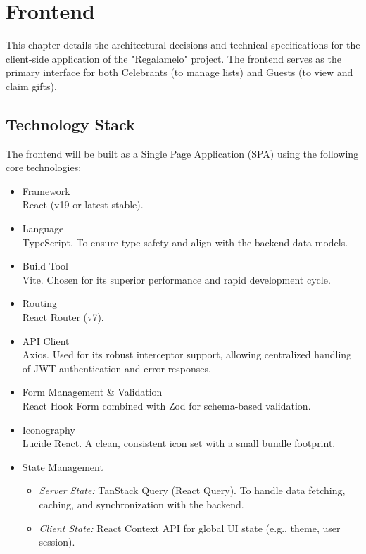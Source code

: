 \chapter{Frontend}
This chapter details the architectural decisions and technical specifications for the client-side application of the "Regalamelo" project. The frontend serves as the primary interface for both Celebrants (to manage lists) and Guests (to view and claim gifts).

\section{Technology Stack}
The frontend will be built as a Single Page Application (SPA) using the following core technologies:
\begin{itemize}
    \item Framework \\
        React (v19 or latest stable).
    \item Language \\
        TypeScript. To ensure type safety and align with the backend data models.
    \item Build Tool \\
        Vite. Chosen for its superior performance and rapid development cycle.
    \item Routing \\
        React Router (v7).
    \item API Client \\
        Axios. Used for its robust interceptor support, allowing centralized handling of JWT authentication and error responses.
    \item Form Management \& Validation \\
        React Hook Form combined with Zod for schema-based validation.
    \item Iconography \\
        Lucide React. A clean, consistent icon set with a small bundle footprint.
    \item State Management \\
    \begin{itemize}
        \item \textit{Server State:} TanStack Query (React Query). To handle data fetching, caching, and synchronization with the backend.
        \item \textit{Client State:} React Context API for global UI state (e.g., theme, user session).

\end{itemize}
\end{itemize}
